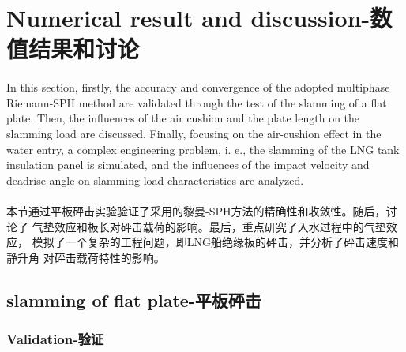 \documentclass[UTF8]{ctexart}
\begin{document}
\section{Numerical result and discussion-数值结果和讨论}
\paragraph{\quad}In this section, firstly, the accuracy and convergence 
            of the adopted multiphase Riemann-SPH method are validated 
            through the test of the slamming of a flat plate. Then, 
            the influences of the air cushion and the plate length on the 
            slamming load are discussed. Finally, focusing on the air-cushion 
            effect in the water entry, a complex engineering problem, i. e., 
            the slamming of the LNG tank insulation panel is simulated, and the 
            influences of the impact velocity and deadrise angle on slamming load 
            characteristics are analyzed.
\paragraph{\quad}本节通过平板砰击实验验证了采用的黎曼-SPH方法的精确性和收敛性。随后，讨论了
                气垫效应和板长对砰击载荷的影响。最后，重点研究了入水过程中的气垫效应，
                模拟了一个复杂的工程问题，即LNG船绝缘板的砰击，并分析了砰击速度和静升角
                对砰击载荷特性的影响。

\subsection{slamming of flat plate-平板砰击}
\subsubsection{Validation-验证}
\end{document}
